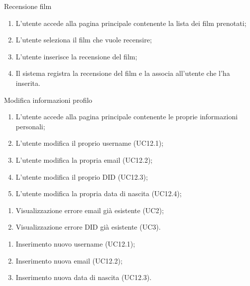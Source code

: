 \begin{usecase}{11}{Recensione film}\label{uc:recensione-film}
  \usecasemain{}
  
  \begin{enumerate}
    \item L'utente accede alla pagina principale contenente la lista dei film prenotati;
    \item L'utente seleziona il film che vuole recensire;
    \item L'utente inserisce la recensione del film;
    \item Il sistema registra la recensione del film e la associa all'utente che l'ha inserita.
  \end{enumerate}
\end{usecase}

\begin{usecase}{12}{Modifica informazioni profilo}\label{uc:modifica-informazioni-profilo}
  \usecasemain{}
  
  \begin{enumerate}
    \item L'utente accede alla pagina principale contenente le proprie informazioni personali;
    \item L'utente modifica il proprio username (UC12.1);
    \item L'utente modifica la propria email (UC12.2);
    \item L'utente modifica il proprio DID (UC12.3);
    \item L'utente modifica la propria data di nascita (UC12.4);
  \end{enumerate}

  \usecaseext{}
  \begin{enumerate}
    \item Visualizzazione errore email già esistente (UC2);
    \item Visualizzazione errore DID già esistente (UC3).
  \end{enumerate}

  \begin{enumerate}
    \item Inserimento nuovo username (UC12.1);
    \item Inserimento nuova email (UC12.2);
    \item Inserimento nuova data di nascita (UC12.3).
  \end{enumerate}
\end{usecase}

